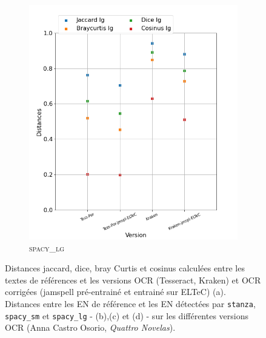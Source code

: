 \begin{figure}[H]
\begin{minipage}{6cm}
\begin{subfigure}{0.89\textwidth}
  \includegraphics[width=.89\textwidth]{IMAGES/ELTeC_DISTANCES_spaCy3.5.1/CASTRO-OSORIO-graph-dist-spaCy3.5.1-lg.png}
   \caption{\textsc{spacy\_lg}}
  \label{fig: }
  \end{subfigure}
  \end{minipage}
\caption{Distances jaccard, dice, bray Curtis et cosinus calculées entre les textes de références et les versions OCR (Tesseract, Kraken) et OCR corrigées (jamspell pré-entrainé et entrainé sur ELTeC) (a). Distances entre les EN de référence et les EN détectées par \texttt{stanza}, \texttt{spacy\_sm} et \texttt{spacy\_lg} - (b),(c) et (d) - sur les différentes versions OCR (Anna Castro Osorio, \textit{Quattro Novelas}).}
\label{fig:}
\end{figure}


